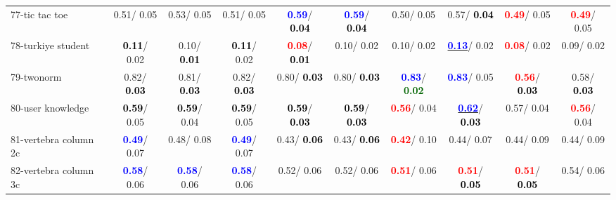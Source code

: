 \begin{table}[h]
\begin{center}
{\begin{tabular}{lc|c|c|c|c|c|c|c|c}
77-tic tac toe &   0.51/  0.05 &   0.53/  0.05 &   0.51/  0.05 & \textcolor{blue}{\textbf{  0.59}}/\textcolor{black}{\textbf{  0.04}} & \textcolor{blue}{\textbf{  0.59}}/\textcolor{black}{\textbf{  0.04}} &   0.50/  0.05 &   0.57/\textcolor{black}{\textbf{  0.04}} & \textcolor{red}{\textbf{  0.49}}/  0.05 & \textcolor{red}{\textbf{  0.49}}/  0.05 \\
78-turkiye student & \textcolor{black}{\textbf{  0.11}}/  0.02 &   0.10/\textcolor{black}{\textbf{  0.01}} & \textcolor{black}{\textbf{  0.11}}/  0.02 & \textcolor{red}{\textbf{  0.08}}/\textcolor{black}{\textbf{  0.01}} &   0.10/  0.02 &   0.10/  0.02 & \underline{\textcolor{blue}{\textbf{  0.13}}}/  0.02 & \textcolor{red}{\textbf{  0.08}}/  0.02 &   0.09/  0.02 \\ \hline
79-twonorm &   0.82/\textcolor{black}{\textbf{  0.03}} &   0.81/\textcolor{black}{\textbf{  0.03}} &   0.82/\textcolor{black}{\textbf{  0.03}} &   0.80/\textcolor{black}{\textbf{  0.03}} &   0.80/\textcolor{black}{\textbf{  0.03}} & \textcolor{blue}{\textbf{  0.83}}/\textcolor{darkgreen}{\textbf{  0.02}} & \textcolor{blue}{\textbf{  0.83}}/  0.05 & \textcolor{red}{\textbf{  0.56}}/\textcolor{black}{\textbf{  0.03}} &   0.58/\textcolor{black}{\textbf{  0.03}} \\
80-user knowledge & \textcolor{black}{\textbf{  0.59}}/  0.05 & \textcolor{black}{\textbf{  0.59}}/  0.04 & \textcolor{black}{\textbf{  0.59}}/  0.05 & \textcolor{black}{\textbf{  0.59}}/\textcolor{black}{\textbf{  0.03}} & \textcolor{black}{\textbf{  0.59}}/\textcolor{black}{\textbf{  0.03}} & \textcolor{red}{\textbf{  0.56}}/  0.04 & \underline{\textcolor{blue}{\textbf{  0.62}}}/\textcolor{black}{\textbf{  0.03}} &   0.57/  0.04 & \textcolor{red}{\textbf{  0.56}}/  0.04 \\
81-vertebra column 2c & \textcolor{blue}{\textbf{  0.49}}/  0.07 &   0.48/  0.08 & \textcolor{blue}{\textbf{  0.49}}/  0.07 &   0.43/\textcolor{black}{\textbf{  0.06}} &   0.43/\textcolor{black}{\textbf{  0.06}} & \textcolor{red}{\textbf{  0.42}}/  0.10 &   0.44/  0.07 &   0.44/  0.09 &   0.44/  0.09 \\
82-vertebra column 3c & \textcolor{blue}{\textbf{  0.58}}/  0.06 & \textcolor{blue}{\textbf{  0.58}}/  0.06 & \textcolor{blue}{\textbf{  0.58}}/  0.06 &   0.52/  0.06 &   0.52/  0.06 & \textcolor{red}{\textbf{  0.51}}/  0.06 & \textcolor{red}{\textbf{  0.51}}/\textcolor{black}{\textbf{  0.05}} & \textcolor{red}{\textbf{  0.51}}/\textcolor{black}{\textbf{  0.05}} &   0.54/  0.06 \\

\end{tabular}}
\end{center}
\end{table}
